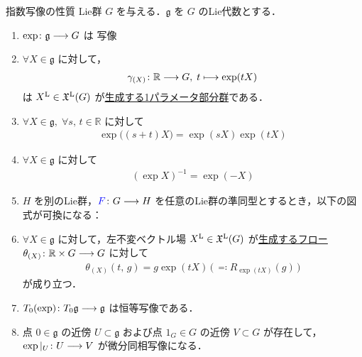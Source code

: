 \documentclass[geometry_main]{subfiles}
\begin{document}
\begin{myprop}[label=prop:exp]{指数写像の性質}
    Lie群 $G$ を与える．$\mathfrak{g}$ を $G$ のLie代数とする．
    \begin{enumerate}
        \item $\exp \colon \mathfrak{g} \longrightarrow G$ は \cinfty 写像 
        \item $\forall X \in \mathfrak{g}$ に対して，
        \begin{align}
            \gamma_{(X)} \colon \mathbb{R} \longrightarrow G,\; t \longmapsto \exp (tX)
        \end{align}
        は $X^{\mathrm{L}} \in \mathfrak{X}^{\mathrm{L}}(G)$ が\hyperref[prop:one-parameter-basic]{生成する1パラメータ部分群}である．
        \item $\forall X \in \mathfrak{g},\; \forall s,\, t \in \mathbb{R}$ に対して
        \begin{align}
            \exp \bigl( (s+t) X\bigr) = \exp (sX) \exp(tX)
        \end{align}
        
        \item $\forall X \in \mathfrak{g}$ に対して
        \begin{align}
            (\exp X)^{-1} = \exp (-X)
        \end{align}
        

        \item $H$ を別のLie群，$\textcolor{blue}{F} \colon G \longrightarrow H$ を任意のLie群の準同型とするとき，以下の図式が可換になる：
        \begin{center}
        \end{center}
        
        \item $\forall X \in \mathfrak{g}$ に対して，左不変ベクトル場 $X^{\mathrm{L}} \in \mathfrak{X}^{\mathrm{L}}(G)$ が\hyperref[thm:fundamental-flow]{生成するフロー} $\theta_{(X)} \colon \mathbb{R} \times G \longrightarrow G$ に対して 
        \begin{align}
            \theta_{(X)}(t,\, g) = g \exp(tX) \, \bigl(\,\eqqcolon R_{\exp(tX)}(g)\,\bigr)
        \end{align}
        が成り立つ．

        \item $T_0 (\exp) \colon T_0 \mathfrak{g} \longrightarrow \mathfrak{g}$ は恒等写像である．
        \item 点 $0 \in \mathfrak{g}$ の近傍 $U \subset \mathfrak{g}$ および点 $1_G \in G$ の近傍 $V \subset G$ が存在して，$\exp|_U \colon U \longrightarrow V$ が微分同相写像になる．
    \end{enumerate}
\end{myprop}
\end{document}
